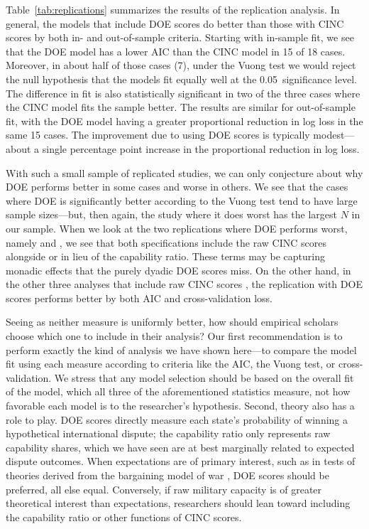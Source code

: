 Table~\ref{tab:replications} summarizes the results of the replication analysis.
In general, the models that include DOE scores do better than those with CINC scores by both in- and out-of-sample criteria.
Starting with in-sample fit, we see that the DOE model has a lower AIC than the CINC model in 15 of 18 cases.
Moreover, in about half of those cases (7), under the Vuong test we would reject the null hypothesis that the models fit equally well at the 0.05~significance level.
The difference in fit is also statistically significant in two of the three cases where the CINC model fits the sample better.
The results are similar for out-of-sample fit, with the DOE model having a greater proportional reduction in log loss in the same 15 cases.
The improvement due to using DOE scores is typically modest---about a single percentage point increase in the proportional reduction in log loss.

With such a small sample of replicated studies, we can only conjecture about why DOE performs better in some cases and worse in others.
We see that the cases where DOE is significantly better according to the Vuong test tend to have large sample sizes---but, then again, the study where it does worst has the largest $N$ in our sample.
When we look at the two replications where DOE performs worst, namely \citet{Bennett:2006gp} and \citet{Fordham:2008gs}, we see that both specifications include the raw CINC scores alongside or in lieu of the capability ratio.
These terms may be capturing monadic effects that the purely dyadic DOE scores miss.
On the other hand, in the other three analyses that include raw CINC scores \citep{Arena:2009gk,Zawahri:2011iy,Weeks:2012be}, the replication with DOE scores performs better by both AIC and cross-validation loss.

Seeing as neither measure is uniformly better, how should empirical scholars choose which one to include in their analysis?
Our first recommendation is to perform exactly the kind of analysis we have shown here---to compare the model fit using each measure according to criteria like the AIC, the Vuong test, or cross-validation.
We stress that any model selection should be based on the overall fit of the model, which all three of the aforementioned statistics measure, not how favorable each model is to the researcher's hypothesis.
Second, theory also has a role to play.
DOE scores directly measure each state's probability of winning a hypothetical international dispute; the capability ratio only represents raw capability shares, which we have seen are at best marginally related to expected dispute outcomes.
When expectations are of primary interest, such as in tests of theories derived from the bargaining model of war \citep{fearon1995}, DOE scores should be preferred, all else equal.
Conversely, if raw military capacity is of greater theoretical interest than expectations, researchers should lean toward including the capability ratio or other functions of CINC scores.

